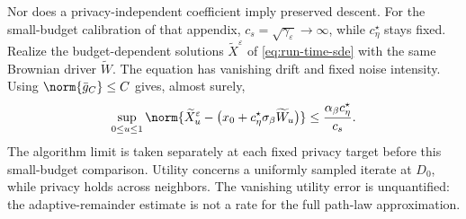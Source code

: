 Nor does a privacy-independent coefficient imply preserved descent.
For the small-budget calibration of that appendix,
$c_s=\sqrt{\gamma_\varepsilon}\to\infty$, while $c_\eta^\star$ stays fixed.
Realize the budget-dependent solutions $\widetilde X^\varepsilon$ of
\eqref{eq:run-time-sde} with the same Brownian driver $\widetilde W$.
The equation has vanishing drift and fixed noise intensity. Using
$\norm{\bar g_C}\leq C$ gives, almost surely,
\begin{equation}\label{eq:brownian-comparison}
 \sup_{0\leq u\leq1}
 \norm{\widetilde X^\varepsilon_u-
       \bigl(x_0+c_\eta^\star\sigma_\beta\widetilde W_u\bigr)}
 \leq\frac{\alpha_\beta c_\eta^\star}{c_s}.
\end{equation}
The algorithm limit is taken separately at each fixed privacy target before
this small-budget comparison. Utility concerns a uniformly sampled iterate
at $D_0$, while privacy holds across neighbors. The vanishing utility error
is unquantified: the adaptive-remainder estimate is not a rate for the full
path-law approximation.

